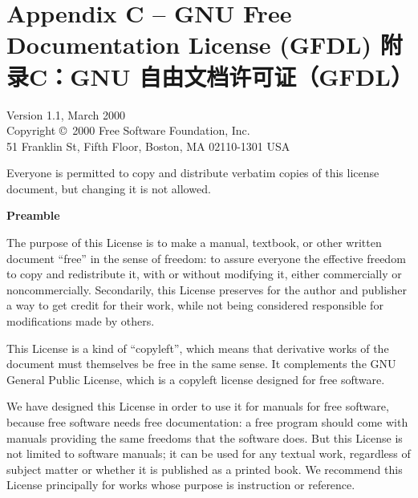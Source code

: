 

\chapter{\ifdefined\eng
Appendix C -- GNU Free Documentation License (GFDL)
\fi
\ifdefined\chs
附录C：GNU 自由文档许可证（GFDL）
\fi} \label{Appendix C}

\ifdefined\eng
\begin{center}
Version 1.1, March 2000\\

 Copyright \copyright\ 2000  Free Software Foundation, Inc.\\
     51 Franklin St, Fifth Floor, Boston, MA  02110-1301  USA

\bigskip

 Everyone is permitted to copy and distribute verbatim copies
 of this license document, but changing it is not allowed.
\end{center}

\begin{center}
{\bf\large Preamble}
\end{center}

The purpose of this License is to make a manual, textbook, or other
written document ``free'' in the sense of freedom: to assure everyone
the effective freedom to copy and redistribute it, with or without
modifying it, either commercially or noncommercially.  Secondarily,
this License preserves for the author and publisher a way to get
credit for their work, while not being considered responsible for
modifications made by others.

This License is a kind of ``copyleft'', which means that derivative
works of the document must themselves be free in the same sense.  It
complements the GNU General Public License, which is a copyleft
license designed for free software.

We have designed this License in order to use it for manuals for free
software, because free software needs free documentation: a free
program should come with manuals providing the same freedoms that the
software does.  But this License is not limited to software manuals;
it can be used for any textual work, regardless of subject matter or
whether it is published as a printed book.  We recommend this License
principally for works whose purpose is instruction or reference.

